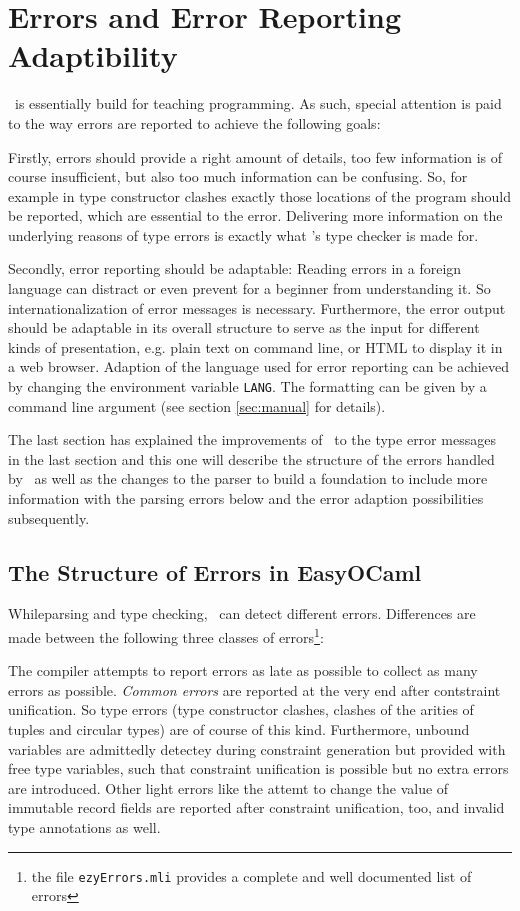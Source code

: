 
\section{Errors and Error Reporting Adaptibility}
\label{sec:errors}

\easyocaml\ is essentially build for teaching programming.
As such, special attention is paid to the way errors are reported to achieve
the following goals:

Firstly, errors should provide a right amount of details, too few information
is of course insufficient, but also too much information can be confusing. So,
for example in type constructor clashes exactly those locations of the program
should be reported, which are essential to the error.
Delivering more information on the underlying reasons of type errors is exactly
what \easyocaml's type checker is made for.

Secondly, error reporting should be adaptable: Reading errors in a foreign
language can distract or even prevent for a beginner from understanding it.
So internationalization of error messages is necessary.
Furthermore, the error output should be adaptable in its overall structure to
serve as the input for different kinds of presentation, e.g. plain text on
command line, or HTML to display it in a web browser.
Adaption of the language used for error reporting can be achieved by changing 
the environment variable \texttt{LANG}. The formatting can be given by a
command line argument (see section \ref{sec:manual} for details).

The last section has explained the improvements of \easyocaml\ to the type error
messages in the last section and this one will describe the structure  of the
errors handled by \easyocaml\ as well as the changes to the parser to build a
foundation to include more information with the parsing errors below and the
error adaption possibilities subsequently.

\subsection{The Structure of Errors in EasyOCaml}
\label{sec:easyerrors}

While\new parsing and type checking, \easyocaml\ can detect different errors.
Differences are made between the following three classes of errors\footnote{the
file \texttt{ezyErrors.mli} provides a complete and well documented list of
errors}:

The compiler attempts to report errors as late as possible to collect as many
errors as possible. \emph{Common errors} are reported at the very end after
contstraint unification. So type errors (type constructor clashes, clashes of
the arities of tuples and circular types) are of course of this kind.
Furthermore, unbound variables are admittedly detectey during constraint
generation but provided with free type variables, such that constraint
unification is possible but no extra errors are introduced.
Other light errors like the attemt to change the value of immutable record
fields are reported after constraint unification, too, and invalid type
annotations as well.


